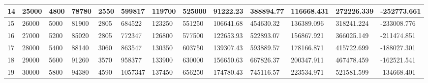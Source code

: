 \begin{table}[]
{\begin{tabular}{|l|l|l|l|l|l|l|l|l|l|l|l|l|}
        14    & 25000     & 4800          & 78780                                                 & 2550                                                           & 599817                                                   & 119700                                                     & 525000                                                          & 91222.23   & 388894.77   & 116668.431    & 272226.339       & -252773.661     \\ \hline
        15    & 26000     & 5000          & 81900                                                 & 2805                                                           & 684522                                                   & 123250                                                     & 551250                                                          & 106641.68  & 454630.32   & 136389.096    & 318241.224       & -233008.776     \\ \hline
        16    & 27000     & 5200          & 85020                                                 & 2805                                                           & 772347                                                   & 126800                                                     & 577500                                                          & 122653.93  & 522893.07   & 156867.921    & 366025.149       & -211474.851     \\ \hline
        17    & 28000     & 5400          & 88140                                                 & 3060                                                           & 863547                                                   & 130350                                                     & 603750                                                          & 139307.43  & 593889.57   & 178166.871    & 415722.699       & -188027.301     \\ \hline
        18    & 29000     & 5600          & 91260                                                 & 3570                                                           & 958377                                                   & 133900                                                     & 630000                                                          & 156650.63  & 667826.37   & 200347.911    & 467478.459       & -162521.541     \\ \hline
        19    & 30000     & 5800          & 94380                                                 & 4590                                                           & 1057347                                                  & 137450                                                     & 656250                                                          & 174780.43  & 745116.57   & 223534.971    & 521581.599       & -134668.401     \\ \hline

\end{tabular}}
\end{table}
